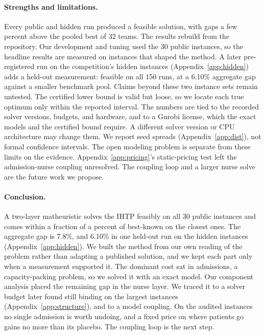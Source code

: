 \documentclass[11pt]{article}
\begin{document}
	\paragraph{Strengths and limitations.} Every public and hidden run produced a feasible solution, with gaps a few percent above the pooled best of 32 teams. The results rebuild from the repository. Our development and tuning used the 30 public instances, so the headline results are measured on instances that shaped the method. A later pre-registered run on the competition's hidden instances (Appendix~\ref{app:hidden}) adds a held-out measurement: feasible on all 150 runs, at a 6.10\% aggregate gap against a smaller benchmark pool. Claims beyond these two instance sets remain untested. The certified lower bound is valid but loose, so we locate each true optimum only within the reported interval. The numbers are tied to the recorded solver versions, budgets, and hardware, and to a Gurobi license, which the exact models and the certified bound require. A different solver version or CPU architecture may change them. We report seed spreads (Appendix~\ref{app:dist}), not formal confidence intervals. The open modeling problem is separate from these limits on the evidence. Appendix~\ref{app:pricing}'s static-pricing test left the admission-nurse coupling unresolved. The coupling loop and a larger nurse solve are the future work we propose.
	
	\paragraph{Conclusion.}
	A two-layer matheuristic solves the IHTP feasibly on all 30 public instances and comes within a
	fraction of a percent of best-known on the closest ones. The aggregate gap is 7.8\%, and 6.10\%
	in one held-out run on the hidden instances (Appendix~\ref{app:hidden}). We built the method from our own reading of the problem rather than adapting a published solution, and we kept each part only when a measurement supported it. The dominant cost sat in admissions, a capacity-packing problem, so we solved it with an exact model. Our component analysis placed the remaining gap in the nurse layer. We traced it to a solver budget later found still binding on the largest instances (Appendix~\ref{app:structure}), and to a model coupling. On the audited instances no single admission is worth undoing, and a fixed price on where patients go gains no more than its placebo. The coupling loop is the next step.
	
\end{document}
